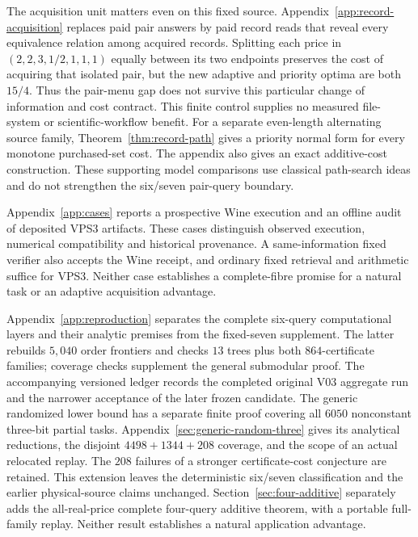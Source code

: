 \documentclass[pdflatex,sn-mathphys-num]{sn-jnl}
\theoremstyle{thmstyleone}
\theoremstyle{thmstylethree}
\theoremstyle{thmstyletwo}
\begin{document}
The acquisition unit matters even on this fixed source. Appendix~\ref{app:record-acquisition} replaces paid pair answers by paid record reads that reveal every equivalence relation among acquired records. Splitting each price in $(2,2,3,1/2,1,1,1)$ equally between its two endpoints preserves the cost of acquiring that isolated pair, but the new adaptive and priority optima are both $15/4$. Thus the pair-menu gap does not survive this particular change of information and cost contract. This finite control supplies no measured file-system or scientific-workflow benefit. For a separate even-length alternating source family, Theorem~\ref{thm:record-path} gives a priority normal form for every monotone purchased-set cost. The appendix also gives an exact additive-cost construction. These supporting model comparisons use classical path-search ideas and do not strengthen the six/seven pair-query boundary.

Appendix~\ref{app:cases} reports a prospective Wine execution and an offline audit of deposited VPS3 artifacts. These cases distinguish observed execution, numerical compatibility and historical provenance. A same-information fixed verifier also accepts the Wine receipt, and ordinary fixed retrieval and arithmetic suffice for VPS3. Neither case establishes a complete-fibre promise for a natural task or an adaptive acquisition advantage.

Appendix~\ref{app:reproduction} separates the complete six-query computational layers and their analytic premises from the fixed-seven supplement. The latter rebuilds $5,040$ order frontiers and checks $13$ trees plus both $864$-certificate families; coverage checks supplement the general submodular proof. The accompanying versioned ledger records the completed original V03 aggregate run and the narrower acceptance of the later frozen candidate.
The generic randomized lower bound has a separate finite proof covering all $6050$ nonconstant three-bit partial tasks. Appendix~\ref{sec:generic-random-three} gives its analytical reductions, the disjoint $4498+1344+208$ coverage, and the scope of an actual relocated replay. The $208$ failures of a stronger certificate-cost conjecture are retained. This extension leaves the deterministic six/seven classification and the earlier physical-source claims unchanged. Section~\ref{sec:four-additive} separately adds the all-real-price complete four-query additive theorem, with a portable full-family replay. Neither result establishes a natural application advantage.
\end{document}
